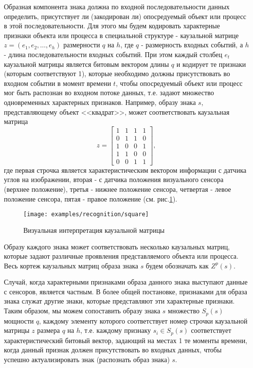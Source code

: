 \documentclass[12pt]{scrartcl}
\newcommand{\linesprval}{1}
\begin{document}
	Образная компонента знака должна по входной последовательности данных определить, присутствует ли (закодирован ли) опосредуемый объект или процесс в этой последовательности. Для этого мы будем кодировать характерные признаки объекта или процесса в специальной структуре - каузальной матрице $z=(e_1,e_2,\dots,e_h)$ размерности $q$ на $h$, где $q$ - размерность входных событий, а $h$ - длина последовательности входных событий. При этом каждый столбец $e_t$ каузальной матрицы является битовым вектором длины $q$ и кодирует те признаки (которым соответствуют 1), которые необходимо должны присутствовать во входном событии в момент времени $t$, чтобы опосредуемый объект или процесс мог быть распознан во входном потоке данных, т.е. задают множество одновременных характерных признаков. Например, образу знака $s$, представляющему объект <<квадрат>>, может соответствовать каузальная матрица 
	\[
	\renewcommand\arraystretch{0.5}
	z=\begin{bmatrix}
	1&1&1&1\\
	0&1&1&0\\
	1&0&0&1\\
	1&1&0&0\\
	0&0&1&1
	\end{bmatrix},
	\]
	\linespread{\linesprval}
	где первая строчка является характеристическим вектором информации с датчика углов на изображении, вторая - с датчика положения визуального сенсора (верхнее положение), третья - нижнее положение сенсора, четвертая - левое положение сенсора, пятая - правое положение (см. рис.\ref{fig:square}).

	\begin{figure}
		\label{fig:square}
		\centering
		\texttt{[image: examples/recognition/square]}
		\caption{Визуальная интерпретация каузальной матрицы}		
	\end{figure}

	Образу каждого знака может соответствовать несколько каузальных матриц, которые задают различные проявления представляемого объекта или процесса. Весь кортеж каузальных матриц образа знака $s$ будем обозначать как $Z^p(s)$. 
	
	Случай, когда характерными признаками образа данного знака выступают данные с сенсоров, является частным. В более общей постановке, признаками для образа знака служат другие знаки, которые представляют эти характерные признаки. Таким образом, мы можем сопоставить образу знака $s$ множество $S_p(s)$ мощности $q$, каждому элементу которого соответствует номер строчки каузальной матрицы $z$ размера $q$ на $h$, т.е. каждому признаку $s_i\in S_p(s)$ соответствует характеристический битовый вектор, задающий на местах 1 те моменты времени, когда данный признак должен присутствовать во входных данных, чтобы успешно актуализировать знак (распознать образ знака) $s$. 
	
\end{document}

